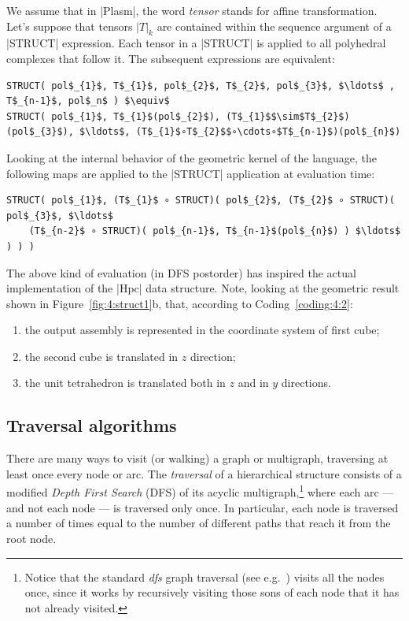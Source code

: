 \begin{coding}
We assume that in |Plasm|, the word \emph{tensor} stands for affine transformation.
Let’s suppose that tensors $|T|_k$ are contained
within the sequence argument of a |STRUCT| expression.
Each tensor in a |STRUCT| is applied to all polyhedral
complexes that follow it. The subsequent expressions are equivalent:

\begin{lstlisting}[language=JuliaLocal, style=julia, mathescape=true]
STRUCT( pol$_{1}$, T$_{1}$, pol$_{2}$, T$_{2}$, pol$_{3}$, $\ldots$ , T$_{n-1}$, pol$_n$ ) $\equiv$ 
STRUCT( pol$_{1}$, T$_{1}$(pol$_{2}$), (T$_{1}$$\sim$T$_{2}$)(pol$_{3}$), $\ldots$, (T$_{1}$∘T$_{2}$$∘\cdots∘$T$_{n-1}$)(pol$_{n}$)
\end{lstlisting}

Looking at the internal behavior of the geometric kernel of the
language, the following maps are applied to the |STRUCT|
application at evaluation time:

\begin{lstlisting}[language=JuliaLocal, style=julia, mathescape=true]
STRUCT( pol$_{1}$, (T$_{1}$ ∘ STRUCT)( pol$_{2}$, (T$_{2}$ ∘ STRUCT)( pol$_{3}$, $\ldots$ 
	(T$_{n-2}$ ∘ STRUCT)( pol$_{n-1}$, T$_{n-1}$(pol$_{n}$) ) $\ldots$ ) ) )
\end{lstlisting}

The above kind of evaluation (in DFS postorder) has inspired the actual implementation of the |Hpc| data structure.
Note, looking at the geometric result shown in
Figure~\ref{fig:4:struct1}b, that, according to Coding~\ref{coding:4:2}:
\begin{enumerate}
    \item
the output assembly is
represented in the coordinate system of first cube; 
    \item
the second cube is translated in $z$ direction; 
    \item
the unit tetrahedron is translated both in $z$ and in $y$ directions.
\end{enumerate}


\subsection*{Traversal algorithms}\label{sect:4-3-3}

There are many ways to visit (or walking) a graph or multigraph, traversing at least once every node or arc.
The \emph{traversal} of a hierarchical structure consists of a 
modified
\emph{Depth First Search} (DFS) of its acyclic multigraph,\footnote{
Notice that the standard \emph{dfs} graph traversal (see 
e.g.~\cite{AhoHopcroftUllman:DSA}) visits all the nodes once, since it works by
recursively visiting those sons of each node that it has not already 
visited. }
where each arc --- and not each node --- is traversed only once.  
In particular, each node is traversed a number of times equal to the
number of different paths that reach it from the root node.


\end{coding}
